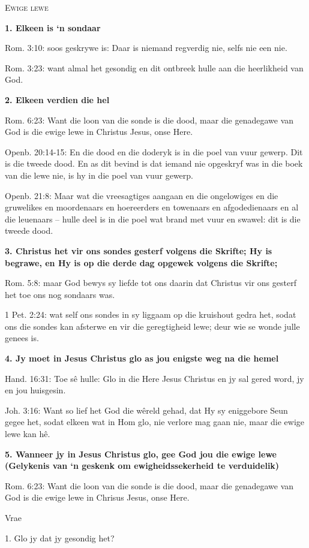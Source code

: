 \textsc{Ewige lewe}

\textbf{1. Elkeen is ‘n sondaar}

Rom. 3:10: soos geskrywe is: Daar is niemand regverdig nie, selfs nie een nie.

Rom. 3:23: want almal het gesondig en dit ontbreek hulle aan die heerlikheid van God.

\textbf{2. Elkeen verdien die hel}

Rom. 6:23: Want die loon van die sonde is die dood, maar die genadegawe van God is die ewige lewe in Christus Jesus, onse Here.

Openb. 20:14-15: En die dood en die doderyk is in die poel van vuur gewerp. Dit is die tweede dood.  En as dit bevind is dat iemand nie opgeskryf was in die boek van die lewe nie, is hy in die poel van vuur gewerp.

Openb. 21:8: Maar wat die vreesagtiges aangaan en die ongelowiges en die gruwelikes en moordenaars en hoereerders en towenaars en afgodedienaars en al die leuenaars – hulle deel is in die poel wat brand met vuur en swawel: dit is die tweede dood.
       
\textbf{3. Christus het vir ons sondes gesterf volgens die Skrifte; Hy is begrawe, en Hy is op die derde dag opgewek volgens die Skrifte;}

Rom. 5:8: maar God bewys sy liefde tot ons daarin dat Christus vir ons gesterf het toe ons nog sondaars was.

1 Pet. 2:24: wat self ons sondes in sy liggaam op die kruishout gedra het, sodat ons die sondes kan afsterwe en vir die geregtigheid lewe; deur wie se wonde julle genees is.

\textbf{4. Jy moet in Jesus Christus glo as jou enigste weg na die hemel}

Hand. 16:31: Toe sê hulle: Glo in die Here Jesus Christus en jy sal gered word, jy en jou huisgesin.

Joh. 3:16: Want so lief het God die wêreld gehad, dat Hy sy eniggebore Seun gegee het, sodat elkeen wat in Hom glo, nie verlore mag gaan nie, maar die ewige lewe kan hê.

\textbf{5. Wanneer jy in Jesus Christus glo, gee God jou die ewige lewe (Gelykenis van ‘n geskenk om ewigheids­sekerheid te verduidelik)}

Rom. 6:23: Want die loon van die sonde is die dood, maar die genadegawe van God is die ewige lewe in Chrisus Jesus, onse Here.

Vrae

  1. Glo jy dat jy gesondig het?

